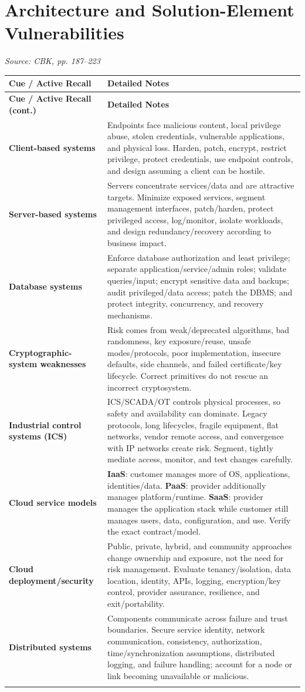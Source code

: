 \documentclass[10pt,letterpaper]{article}
\makeatletter
\newenvironment{cornell}{\rowcolors{2}{white}{notebg}\begin{longtable}{@{}>{\raggedright\arraybackslash\columncolor{cuebg}\color{navy}\bfseries}p{0.285\textwidth}>{\raggedright\arraybackslash}p{0.65\textwidth}@{}}
\rowcolor{navy}\color{white}\textbf{Cue / Active Recall} & \color{white}\textbf{Detailed Notes}\\ \hline\endfirsthead
\rowcolor{navy}\color{white}\textbf{Cue / Active Recall (cont.)} & \color{white}\textbf{Detailed Notes}\\ \hline\endhead}{\end{longtable}}
\newcommand{\noterow}[2]{#1 & #2\\\arrayrulecolor{line}\hline}
\newcommand{\source}[1]{\par{\footnotesize\color{teal}\textit{Source: CBK, #1}}\par}
\makeatother
\begin{document}
\section{\color{navy}Architecture and Solution-Element Vulnerabilities}
\source{pp. 187--223}
\begin{cornell}
\noterow{Client-based systems}{Endpoints face malicious content, local privilege abuse, stolen credentials, vulnerable applications, and physical loss. Harden, patch, encrypt, restrict privilege, protect credentials, use endpoint controls, and design assuming a client can be hostile.}
\noterow{Server-based systems}{Servers concentrate services/data and are attractive targets. Minimize exposed services, segment management interfaces, patch/harden, protect privileged access, log/monitor, isolate workloads, and design redundancy/recovery according to business impact.}
\noterow{Database systems}{Enforce database authorization and least privilege; separate application/service/admin roles; validate queries/input; encrypt sensitive data and backups; audit privileged/data access; patch the DBMS; and protect integrity, concurrency, and recovery mechanisms.}
\noterow{Cryptographic-system weaknesses}{Risk comes from weak/deprecated algorithms, bad randomness, key exposure/reuse, unsafe modes/protocols, poor implementation, insecure defaults, side channels, and failed certificate/key lifecycle. Correct primitives do not rescue an incorrect cryptosystem.}
\noterow{Industrial control systems (ICS)}{ICS/SCADA/OT controls physical processes, so safety and availability can dominate. Legacy protocols, long lifecycles, fragile equipment, flat networks, vendor remote access, and convergence with IP networks create risk. Segment, tightly mediate access, monitor, and test changes carefully.}
\noterow{Cloud service models}{\textbf{IaaS}: customer manages more of OS, applications, identities/data. \textbf{PaaS}: provider additionally manages platform/runtime. \textbf{SaaS}: provider manages the application stack while customer still manages users, data, configuration, and use. Verify the exact contract/model.}
\noterow{Cloud deployment/security}{Public, private, hybrid, and community approaches change ownership and exposure, not the need for risk management. Evaluate tenancy/isolation, data location, identity, APIs, logging, encryption/key control, provider assurance, resilience, and exit/portability.}
\noterow{Distributed systems}{Components communicate across failure and trust boundaries. Secure service identity, network communication, consistency, authorization, time/synchronization assumptions, distributed logging, and failure handling; account for a node or link becoming unavailable or malicious.}

\end{cornell}
\end{document}
